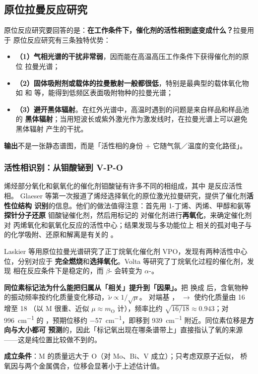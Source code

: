 \subsection{原位拉曼反应研究}

\begin{probout}
原位反应研究要回答的是：\textbf{在工作条件下，催化剂的活性相到底变成什么？}拉曼用于
原位反应研究有三条独特优势：

\begin{itemize}
\item \textbf{（1）气相光谱的干扰非常弱}，因而能在高温高压工作条件下获得催化剂的原位
  拉曼光谱；
\item \textbf{（2）固体吸附剂或载体的拉曼散射一般都很低}，特别是最典型的载体氧化物如
    和  等，能得到低频区表面吸附物种的拉曼光谱；
\item \textbf{（3）避开黑体辐射}。在红外光谱中，高温时遇到的问题是来自样品和样品池的
   \textbf{黑体辐射}；当用短波长或紫外激光作为激发线时，在拉曼光谱上可以避免黑体辐射
  产生的干扰。
\end{itemize}

\textbf{输出}不是一张静态谱图，而是「活性相的身份 + 它随气氛／温度的变化路径」。
\end{probout}

\subsubsection{活性相识别：从钼酸铋到 V-P-O}

烯烃部分氧化和氨氧化的催化剂钼酸铋有许多不同的相组成，其中  是反应活性相。
Glaeser 等第一次报道了烯烃选择氧化的原位激光拉曼研究，提供了催化剂\textbf{活性位结构
识别}的信息。他们的做法值得注意：首先用 1-丁烯、丙烯、甲醇和氨等\textbf{探针分子还原}
钼酸铋催化剂，然后用标记的  对催化剂进行\textbf{再氧化}，来确定催化剂对
丙烯氧化和氨氧化反应的活性中心；结果发现与多功能位上  相关的孤对电子与
 的化学吸附、还原和解离是有关的
。

Laskier 等用原位拉曼光谱研究了正丁烷氧化催化剂 VPO，发现有两种活性中心位，分别对应于
\textbf{完全燃烧}和\textbf{选择氧化}。Volta 等研究了丁烷氧化过程的催化剂，发现
 相在反应条件下是稳定的，而 $\beta$- 会转变为
$\alpha$-。

\begin{principle}
\textbf{同位素标记法为什么能把归属从「相关」提升到「因果」。}把  换成
 后，含氧物种的振动频率按约化质量变化移动，$\tilde\nu \propto 1/\sqrt{\mu}$。
对端基 ， $\rightarrow$  使约化质量由 16 增至 18
（以 M 很重、近似 $\mu \approx m_{\mathrm{O}}$ 计），频率比约
$\sqrt{16/18} \approx 0.943$；对 \qty{996}{cm^{-1}} 的 ，预期位移约
\qty{-57}{cm^{-1}}，即移到 \qty{939}{cm^{-1}} 附近。同位素位移是\textbf{方向与大小都可
预测}的，因此「标记氧出现在哪条谱带上」直接指认了氧的来源——这是纯位置比较做不到的。

\textbf{成立条件}：M 的质量远大于 O（对 Mo、Bi、V 成立）；只考虑双原子近似，
桥氧因与两个金属偶合，位移会显著小于上述估计值。
\end{principle}

